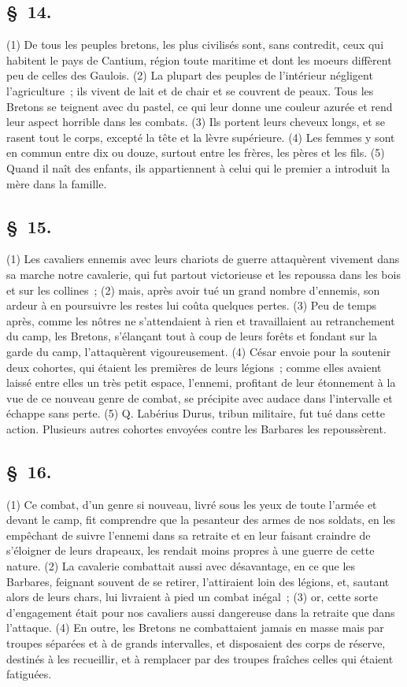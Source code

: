 \documentclass[french,twoside]{book} %
\begin{document}
\subsection[{§ 14.}]{ \textsc{§ 14.} }
\noindent (1) De tous les peuples bretons, les plus civilisés sont, sans contredit, ceux qui habitent le pays de Cantium, région toute maritime et dont les moeurs diffèrent peu de celles des Gaulois. (2) La plupart des peuples de l’intérieur négligent l’agriculture ; ils vivent de lait et de chair et se couvrent de peaux. Tous les Bretons se teignent avec du pastel, ce qui leur donne une couleur azurée et rend leur aspect horrible dans les combats. (3) Ils portent leurs cheveux longs, et se rasent tout le corps, excepté la tête et la lèvre supérieure. (4) Les femmes y sont en commun entre dix ou douze, surtout entre les frères, les pères et les fils. (5) Quand il naît des enfants, ils appartiennent à celui qui le premier a introduit la mère dans la famille.
\subsection[{§ 15.}]{ \textsc{§ 15.} }
\noindent (1) Les cavaliers ennemis avec leurs chariots de guerre attaquèrent vivement dans sa marche notre cavalerie, qui fut partout victorieuse et les repoussa dans les bois et sur les collines ; (2) mais, après avoir tué un grand nombre d’ennemis, son ardeur à en poursuivre les restes lui coûta quelques pertes. (3) Peu de temps après, comme les nôtres ne s’attendaient à rien et travaillaient au retranchement du camp, les Bretons, s’élançant tout à coup de leurs forêts et fondant sur la garde du camp, l’attaquèrent vigoureusement. (4) César envoie pour la soutenir deux cohortes, qui étaient les premières de leurs légions ; comme elles avaient laissé entre elles un très petit espace, l’ennemi, profitant de leur étonnement à la vue de ce nouveau genre de combat, se précipite avec audace dans l’intervalle et échappe sans perte. (5) Q. Labérius Durus, tribun militaire, fut tué dans cette action. Plusieurs autres cohortes envoyées contre les Barbares les repoussèrent.
\subsection[{§ 16.}]{ \textsc{§ 16.} }
\noindent (1) Ce combat, d’un genre si nouveau, livré sous les yeux de toute l’armée et devant le camp, fit comprendre que la pesanteur des armes de nos soldats, en les empêchant de suivre l’ennemi dans sa retraite et en leur faisant craindre de s’éloigner de leurs drapeaux, les rendait moins propres à une guerre de cette nature. (2) La cavalerie combattait aussi avec désavantage, en ce que les Barbares, feignant souvent de se retirer, l’attiraient loin des légions, et, sautant alors de leurs chars, lui livraient à pied un combat inégal ; (3) or, cette sorte d’engagement était pour nos cavaliers aussi dangereuse dans la retraite que dans l’attaque. (4) En outre, les Bretons ne combattaient jamais en masse mais par troupes séparées et à de grands intervalles, et disposaient des corps de réserve, destinés à les recueillir, et à remplacer par des troupes fraîches celles qui étaient fatiguées.
\end{document}
